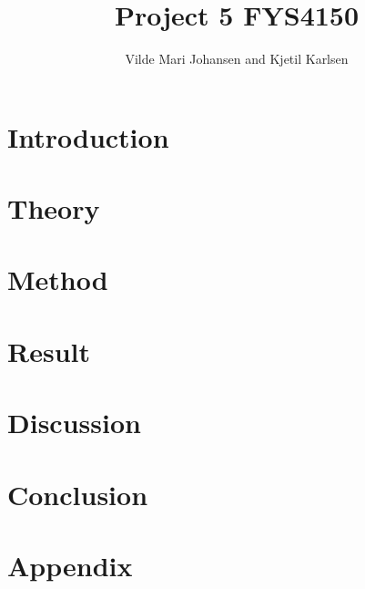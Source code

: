 



\title{Project 5 FYS4150}
\author{Vilde Mari Johansen and Kjetil Karlsen}
\raggedbottom



\maketitle

\pagestyle{fancy}



\begin{abstract}







  
\tableofcontents
\end{abstract}


\section{Introduction}


\section{Theory}


\section{Method}


\section{Result \label{sec:res}}


\section{Discussion}


\section{Conclusion}


\newpage



\section*{Appendix}




